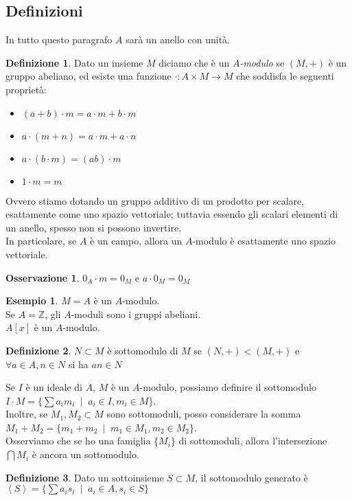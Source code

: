 \documentclass[a4paper,10pt]{article}
\theoremstyle{plain}
\theoremstyle{definition}
\newtheorem{defn}{Definizione}[section]
\newtheorem*{exmp}{Esempio}
\newtheorem*{oss}{Osservazione}
\DeclareMathOperator{\st}{\; |\;}
\newcommand{\Z}{\mathbb{Z}}
\newcommand{\gen}[1]{\ensuremath{\left< #1\right>}}
\begin{document}
\subsection{Definizioni}
In tutto questo paragrafo $A$ sarà un anello con unità.\\
\begin{defn}
    Dato un insieme $M$ diciamo che è un \emph{$A$-modulo} se $(M,+)$ è un gruppo abeliano, ed esiste una funzione $\cdot:A\times M\to M$ che soddisfa le seguenti proprietà:
    \begin{itemize}
        \item $(a+b)\cdot m=a\cdot m+b\cdot m$
        \item $a\cdot(m+n)=a\cdot m+a\cdot n$
        \item $a\cdot(b\cdot m)=(ab)\cdot m$
        \item $1\cdot m=m$
    \end{itemize}
\end{defn}
Ovvero stiamo dotando un gruppo additivo di un prodotto per scalare, esattamente come uno spazio vettoriale; tuttavia essendo gli scalari elementi di un anello, spesso non si possono invertire.\\
In particolare, se $A$ è un campo, allora un $A$-modulo è esattamente uno spazio vettoriale.
\begin{oss}
    $0_A\cdot m=0_M$ e $a\cdot 0_M=0_M$
\end{oss}
\begin{exmp}
    $M=A$ è un $A$-modulo.\\ Se $A=\Z$, gli $A$-moduli sono i gruppi abeliani.\\ $A[x]$ è un $A$-modulo.
\end{exmp}
\begin{defn}
    $N\subset M$ è sottomodulo di $M$ se $(N,+)<(M,+)$ e $\forall a\in A,n\in N$ si ha $an\in N$
\end{defn}
Se $I$ è un ideale di $A$, $M$ è un $A$-modulo, possiamo definire il sottomodulo $I\cdot M=\{ \sum a_im_i\st a_i\in I,m_i\in M \}$.\\
Inoltre, se $M_1,M_2\subset M$ sono sottomoduli, posso considerare la somma $M_1+M_2=\{m_1+m_2\st m_1\in M_1,m_2\in M_2\}$.\\
Osserviamo che se ho una famiglia $\{M_i\}$ di sottomoduli, allora l'intersezione $\bigcap M_i$ è ancora un sottomodulo.
\begin{defn}
    Dato un sottoinsieme $S\subset M$, il sottomodulo generato è $\gen{S}=\{ \sum a_is_i\st a_i\in A,s_i\in S \}$
\end{defn}
\end{document}

